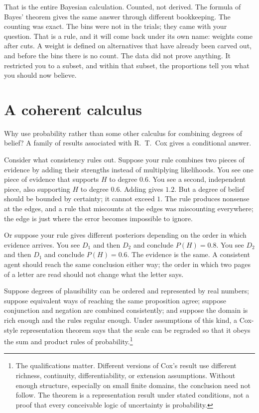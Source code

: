That is the entire Bayesian calculation. Counted, not derived. The formula of Bayes' theorem gives the same answer through different bookkeeping. The counting was exact. The bins were not in the trials; they came with your question. That is a rule, and it will come back under its own name: weights come after cuts. A weight is defined on alternatives that have already been carved out, and before the bins there is no count. The data did not prove anything. It restricted you to a subset, and within that subset, the proportions tell you what you should now believe.

\section*{A coherent calculus}

Why use probability rather than some other calculus for combining degrees of belief? A family of results associated with R.\ T.\ Cox gives a conditional answer.

Consider what consistency rules out. Suppose your rule combines two pieces of evidence by adding their strengths instead of multiplying likelihoods. You see one piece of evidence that supports $H$ to degree $0.6$. You see a second, independent piece, also supporting $H$ to degree $0.6$. Adding gives $1.2$. But a degree of belief should be bounded by certainty; it cannot exceed $1$. The rule produces nonsense at the edges, and a rule that miscounts at the edges was miscounting everywhere; the edge is just where the error becomes impossible to ignore.

Or suppose your rule gives different posteriors depending on the order in which evidence arrives. You see $D_1$ and then $D_2$ and conclude $P(H) = 0.8$. You see $D_2$ and then $D_1$ and conclude $P(H) = 0.6$. The evidence is the same. A consistent agent should reach the same conclusion either way; the order in which two pages of a letter are read should not change what the letter says.

Suppose degrees of plausibility can be ordered and represented by real numbers; suppose equivalent ways of reaching the same proposition agree; suppose conjunction and negation are combined consistently; and suppose the domain is rich enough and the rules regular enough. Under assumptions of this kind, a Cox-style representation theorem says that the scale can be regraded so that it obeys the sum and product rules of probability.\footnote{The qualifications matter. Different versions of Cox's result use different richness, continuity, differentiability, or extension assumptions. Without enough structure, especially on small finite domains, the conclusion need not follow. The theorem is a representation result under stated conditions, not a proof that every conceivable logic of uncertainty is probability.}


